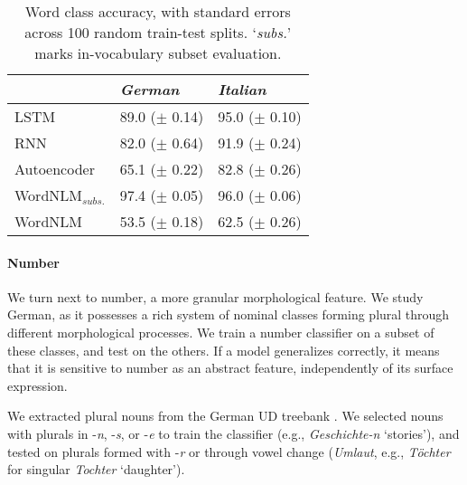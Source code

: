 \begin{table}[t]
\footnotesize
    \begin{center}
      \begin{tabular}{l|l|l}
        &\emph{German}&\emph{Italian}\\
        \hline
        LSTM & 89.0 ($\pm$ 0.14) & 95.0 ($\pm$ 0.10) \\
        RNN & 82.0 ($\pm$ 0.64) & 91.9 ($\pm$ 0.24) \\
        Autoencoder & 65.1 ($\pm$ 0.22) & 82.8 ($\pm$ 0.26) \\
	      WordNLM$_{\textit{subs.}}$ & 97.4 ($\pm$ 0.05) & 96.0 ($\pm$ 0.06) \\
	      WordNLM & 53.5 ($\pm$ 0.18)  & 62.5 ($\pm$ 0.26) \\
      \end{tabular}
    \end{center}
	\caption{\label{tab:pos-results} Word class accuracy, with standard errors across 100 random train-test splits. `\emph{subs.}' marks in-vocabulary subset evaluation.} %
\end{table}







\paragraph{Number}
We turn next to number, a more granular morphological feature. We
study German, as it possesses a rich system of nominal classes forming
plural through different morphological processes. We train a number
classifier on a subset of these classes, and test on the others. If a
model generalizes correctly, it means that it is sensitive to number
as an abstract feature, independently of its surface expression.

We extracted plural nouns from the German UD
treebank \cite{de2006generating,mcdonald2013universal}.  We selected
nouns with plurals in -\emph{n}, -\emph{s}, or -\emph{e} to train the classifier (e.g., \emph{Geschichte-n} `stories'), and tested on plurals formed with
-\emph{r} or through vowel change (\emph{Umlaut}, e.g., \emph{T{\"o}chter} for singular \emph{Tochter} `daughter').

